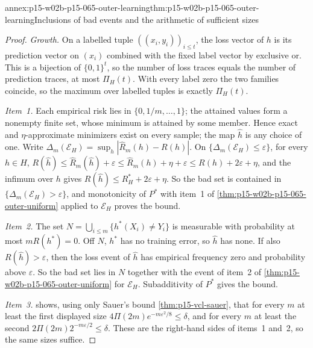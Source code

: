 \begin{annexitem}{annex:p15-w02b-p15-065-outer-learning}{thm:p15-w02b-p15-065-outer-learning}{Inclusions of bad events and the arithmetic of sufficient sizes}
\begin{proof}
\emph{Growth.} On a labelled tuple \(((x_i,y_i))_{i\leq t}\), the loss
vector of \(h\) is its prediction vector on \((x_i)\) combined with the
fixed label vector by exclusive or. This is a bijection of \(\{0,1\}^t\),
so the number of loss traces equals the number of prediction traces, at
most \(\Pi_H(t)\). With every label zero the two families coincide, so the
maximum over labelled tuples is exactly \(\Pi_H(t)\).

\emph{Item~1.} Each empirical risk lies in \(\{0,1/m,\ldots,1\}\); the
attained values form a nonempty finite set, whose minimum is attained by
some member. Hence exact and \(\eta\)-approximate minimizers exist on every
sample; the map \(\widehat h\) is any choice of one. Write
\(\Delta_m(\mathcal E_H)=\sup_h|\widehat R_m(h)-R(h)|\). On
\(\{\Delta_m(\mathcal E_H)\leq\varepsilon\}\), for every \(h\in H\),
\(R(\widehat h)\leq\widehat R_m(\widehat h)+\varepsilon
\leq\widehat R_m(h)+\eta+\varepsilon\leq R(h)+2\varepsilon+\eta\), and the
infimum over \(h\) gives \(R(\widehat h)\leq R_H^{*}+2\varepsilon+\eta\).
So the bad set is contained in \(\{\Delta_m(\mathcal E_H)>\varepsilon\}\),
and monotonicity of \(P^{*}\) with item~1 of
\cref{thm:p15-w02b-p15-065-outer-uniform} applied to \(\mathcal E_H\)
proves the bound.

\emph{Item~2.} The set \(N=\bigcup_{i\leq m}\{h^{*}(X_i)\ne Y_i\}\) is
measurable with probability at most \(mR(h^{*})=0\). Off \(N\), \(h^{*}\)
has no training error, so \(\widehat h\) has none. If also
\(R(\widehat h)>\varepsilon\), then the loss event of \(\widehat h\) has
empirical frequency zero and probability above \(\varepsilon\). So the bad
set lies in \(N\) together with the event of item~2 of
\cref{thm:p15-w02b-p15-065-outer-uniform} for \(\mathcal E_H\).
Subadditivity of \(P^{*}\) gives the bound.

\emph{Item~3.}  shows, using only Sauer's bound
\cref{thm:p15-vcl-sauer}, that for every \(m\) at least the first displayed
size \(4\Pi(2m)e^{-m\varepsilon^2/8}\leq\delta\), and for every \(m\) at
least the second \(2\Pi(2m)2^{-m\varepsilon/2}\leq\delta\). These are the
right-hand sides of items~1 and~2, so the same sizes suffice.
\end{proof}
\end{annexitem}

